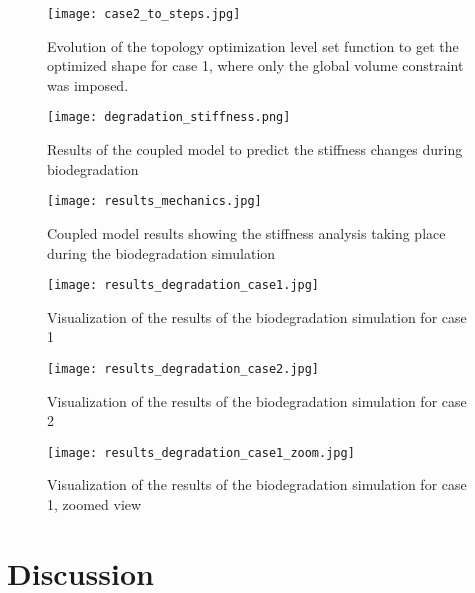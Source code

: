 \begin{figure}[h]
\centering
\medskip
\texttt{[image: case2\_to\_steps.jpg]}
\caption[Evolution of the topology optimization level set function for case 2]{Evolution of the topology optimization level set function to get the optimized shape for case 1, where only the global volume constraint was imposed.} \label{fig:infill_case2_to_steps}
\end{figure}



\begin{figure}[h]
\centering
\medskip
\texttt{[image: degradation\_stiffness.png]}
\caption[Results of the coupled model to predict the stiffness changes during biodegradation]{Results of the coupled model to predict the stiffness changes during biodegradation} \label{fig:infill_degradation_stiffness}
\end{figure}


\begin{figure}[h]
\centering
\medskip
\texttt{[image: results\_mechanics.jpg]}
\caption[Coupled model results showing the stiffness analysis taking place during biodegradation simulation]{Coupled model results showing the stiffness analysis taking place during the biodegradation simulation} \label{fig:infill_results_mechanics}
\end{figure}


\begin{figure}[h]
\centering
\medskip
\texttt{[image: results\_degradation\_case1.jpg]}
\caption[Visualization of the results of the biodegradation simulation for case 1]{Visualization of the results of the biodegradation simulation for case 1} \label{fig:infill_results_degradation_case1}
\end{figure}


\begin{figure}[h]
\centering
\medskip
\texttt{[image: results\_degradation\_case2.jpg]}
\caption[Visualization of the results of the biodegradation simulation for case 2]{Visualization of the results of the biodegradation simulation for case 2} \label{fig:infill_results_degradation_case2}
\end{figure}


\begin{figure}[h]
\centering
\medskip
\texttt{[image: results\_degradation\_case1\_zoom.jpg]}
\caption[Zoom view of the results of the biodegradation simulation for case 1]{Visualization of the results of the biodegradation simulation for case 1, zoomed view} \label{fig:infill_results_degradation_case1_zoom}
\end{figure}

\section{Discussion}


\cleardoublepage

